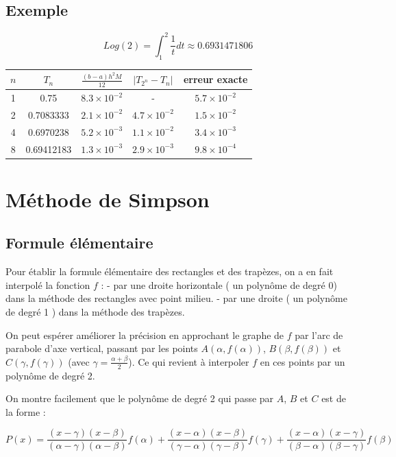 \subsection{Exemple}
\[
Log(2) = \displaystyle\int_{1}^{2} \frac{1}{t} dt \approx 0.6931471806
\]

\begin{table}[H]
	\centering
	\begin{tabular}{ccccc}
		\(n\) & \(T_n\) & \(\frac{(b-a)h^2M}{12}\) & \(|T_{2^n} - T_n|\) & erreur exacte \\
		\hline
		1 & 0.75 & \(8.3\times10^{-2}\) & - & \(5.7\times10^{-2}\) \\
		2 & 0.7083333 & \(2.1\times10^{-2}\) & \(4.7\times10^{-2}\) & \(1.5\times10^{-2}\) \\
		4 & 0.6970238 & \(5.2\times10^{-3}\) & \(1.1\times10^{-2}\) & \(3.4\times10^{-3}\) \\
		8 & 0.69412183 & \(1.3\times10^{-3}\) & \(2.9\times10^{-3}\) & \(9.8\times10^{-4}\) \\
	\end{tabular}
\end{table}

\section{Méthode de Simpson}
\subsection{Formule élémentaire}
Pour établir la formule élémentaire des rectangles et des trapèzes, on a en fait interpolé la fonction \( f \) :
- par une droite horizontale ( un polynôme de degré 0) dans la méthode des rectangles avec point milieu.
- par une droite ( un polynôme de degré 1 ) dans la méthode des trapèzes.

On peut espérer améliorer la précision en approchant le graphe de \( f \) par l'arc de parabole d'axe vertical, passant par les points \( A(\alpha, f(\alpha)) \), \( B(\beta, f(\beta)) \) et \( C(\gamma, f(\gamma)) \) (avec \( \gamma = \frac{\alpha + \beta}{2} \)). Ce qui revient à interpoler \( f \) en ces points par un polynôme de degré 2.

On montre facilement que le polynôme de degré 2 qui passe par \( A \), \( B \) et \( C \) est de la forme :

\[
P(x) = \frac{(x-\gamma)(x-\beta)}{(\alpha-\gamma)(\alpha-\beta)}f(\alpha) + \frac{(x-\alpha)(x-\beta)}{(\gamma-\alpha)(\gamma-\beta)}f(\gamma) + \frac{(x-\alpha)(x-\gamma)}{(\beta-\alpha)(\beta-\gamma)}f(\beta)
\]

